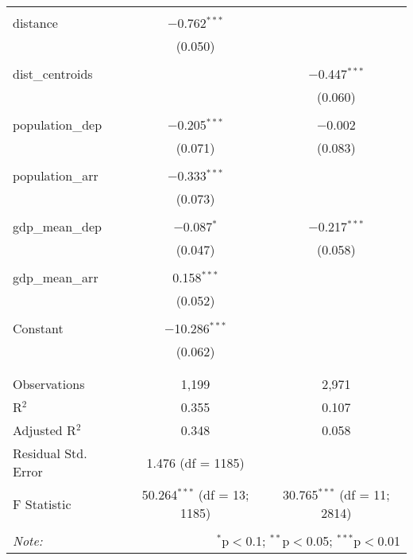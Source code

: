 \begin{table}[!htbp]
\begin{tabular}{@{\extracolsep{5pt}}lcc}
  & & \\ 
 distance & $-$0.762$^{***}$ &  \\ 
  & (0.050) &  \\ 
  & & \\ 
 dist\_centroids &  & $-$0.447$^{***}$ \\ 
  &  & (0.060) \\ 
  & & \\ 
 population\_dep & $-$0.205$^{***}$ & $-$0.002 \\ 
  & (0.071) & (0.083) \\ 
  & & \\ 
 population\_arr & $-$0.333$^{***}$ &  \\ 
  & (0.073) &  \\ 
  & & \\ 
 gdp\_mean\_dep & $-$0.087$^{*}$ & $-$0.217$^{***}$ \\ 
  & (0.047) & (0.058) \\ 
  & & \\ 
 gdp\_mean\_arr & 0.158$^{***}$ &  \\ 
  & (0.052) &  \\ 
  & & \\ 
 Constant & $-$10.286$^{***}$ &  \\ 
  & (0.062) &  \\ 
  & & \\ 
\hline \\[-1.8ex] 
Observations & 1,199 & 2,971 \\ 
R$^{2}$ & 0.355 & 0.107 \\ 
Adjusted R$^{2}$ & 0.348 & 0.058 \\ 
Residual Std. Error & 1.476 (df = 1185) &  \\ 
F Statistic & 50.264$^{***}$ (df = 13; 1185) & 30.765$^{***}$ (df = 11; 2814) \\ 
\hline 
\hline \\[-1.8ex] 
\textit{Note:}  & \multicolumn{2}{r}{$^{*}$p$<$0.1; $^{**}$p$<$0.05; $^{***}$p$<$0.01} \\ 
\end{tabular} 
\end{table} 
